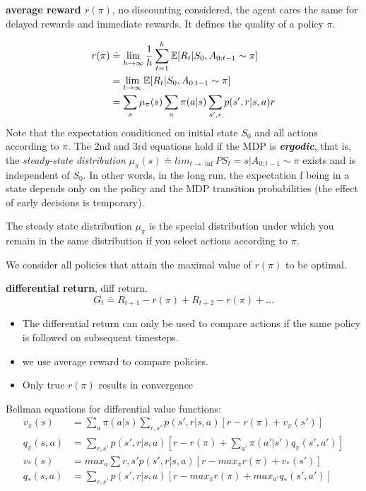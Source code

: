\documentclass[sutton_barto_notes.tex]{subfiles}
\begin{document}
\begin{definition}
\textbf{average reward $r(\pi)$}, no discounting considered, the agent cares the same for delayed rewards and immediate rewards. It defines the quality of a policy $\pi$.
\end{definition}
\begin{align*}
r(\pi)&\doteq \lim_{h\to\infty} \frac{1}{h} \sum_{t=1}^h \operatorname*{\mathbb{E}}[R_t|S_0, A_{0:t-1} \sim \pi]\\
&=\lim_{t\to\infty}\operatorname*{\mathbb{E}}[R_t|S_0, A_{0:t-1} \sim \pi]\\
&=\sum_s \mu_\pi(s) \sum_a \pi(a|s) \sum_{s',r} p(s',r|s,a)r
\end{align*}
Note that the expectation conditioned on initial state $S_0$ and all actions according to $\pi$. The 2nd and 3rd equations hold if the MDP is \textbf{\textit{ergodic}}, that is, the \textit{steady-state distribution} $\mu_\pi(s)\doteq lim_{t\rightarrow\inf}P{S_t=s|A_{0:t-1}\sim\pi}$ exists and is independent of $S_0$.
In other words, in the long run, the expectation f being in a state depends only on the policy and the MDP transition probabilities (the effect of early decisions is temporary).

The steady state distribution $\mu_\pi$ is the special distribution under which you remain in the same distribution if you select actions according to $\pi$.

We consider all policies that attain the maximal value of $r(\pi)$ to be optimal.

\begin{definition}
\textbf{differential return}, diff return.
$$G_t \doteq R_{t+1} - r(\pi) + R_{t+2} - r(\pi) + ...$$
\end{definition}
\begin{itemize}
\item The differential return can only be used to compare actions if the same policy is followed on subsequent timesteps.
\item we use average reward to compare policies.
\item Only true $r(\pi)$ results in convergence
\end{itemize}

Bellman equations for differential value functions:
\begin{align*}
v_\pi(s) &= \sum_a \pi(a|s)\sum_{r,s'}p(s',r|s,a)[r-r(\pi)+v_\pi(s')]\\
q_\pi(s,a)&=\sum_{r,s'}p(s',r|s,a)[r-r(\pi)+\sum_{a'}\pi(a'|s')q_\pi(s',a')]\\
v_*(s)&= max_a \sum{r,s'}p(s',r|s,a)[r-max_\pi r(\pi) + v_*(s')]\\
q_*(s,a) &= \sum_{r,s'}p(s',r|s,a)[r-max_\pi r(\pi) + max_{a'} q_*(s',a')]
\end{align*}
\end{document}
